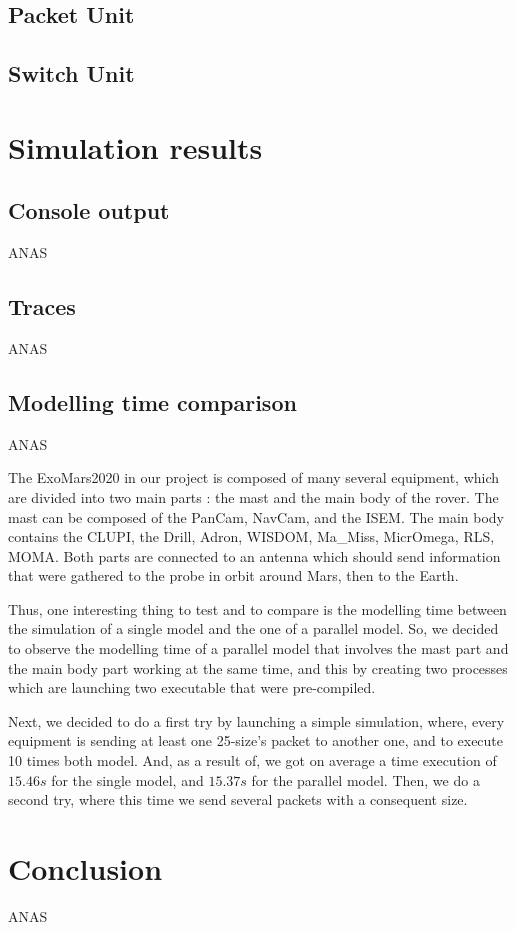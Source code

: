 \documentclass[12pt,a4paper]{article}
\begin{document}
\subsection{Packet Unit}
\subsection{Switch Unit}


\pagebreak

\section{Simulation results}

\subsection{Console output}

ANAS

\subsection{Traces}

ANAS

\subsection{Modelling time comparison}

ANAS

The ExoMars2020 in our project is composed of many several equipment, which are divided into two main parts : the mast and the main body of the rover. The mast can be composed of the PanCam, NavCam, and the ISEM. The main body contains the CLUPI, the Drill, Adron, WISDOM, Ma\_Miss, MicrOmega, RLS, MOMA. Both parts are connected to an antenna which should send information that were gathered to the probe in orbit around Mars, then to the Earth.\smallbreak

Thus, one interesting thing to test and to compare is the modelling time between the simulation of a single model and the one of a parallel model. So, we decided to observe the modelling time of a parallel model that involves the mast part and the main body part working at the same time, and this by creating two processes which are launching two executable that were pre-compiled.\smallbreak

Next, we decided to do a first try by launching a simple simulation, where, every equipment is sending at least one 25-size's packet to another one, and to execute 10 times both model. And, as a result of, we got on average a time execution of $15.46 s$ for the single model, and $15.37 s$ for the parallel model. Then, we do a second try, where this time we send several packets with a consequent size.\smallbreak

\pagebreak

\section{Conclusion}

ANAS

\pagebreak
\nocite{*}


\end{document}
